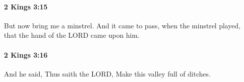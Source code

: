 		\paragraph{2 Kings 3:15} %
			\label{2KINGS-3-15}

			But now bring me a minstrel. And it came to pass, when the minstrel played, that the hand of the LORD came upon him.


		\paragraph{2 Kings 3:16} %
			\label{2KINGS-3-16}

			And he said, Thus saith the LORD, Make this valley full of ditches.


